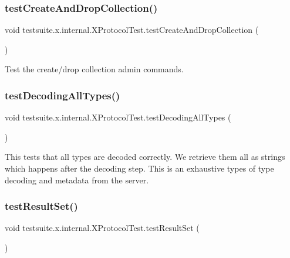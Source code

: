 \subsubsection{\texorpdfstring{test\+Create\+And\+Drop\+Collection()}{testCreateAndDropCollection()}}
{\footnotesize\ttfamily void testsuite.\+x.\+internal.\+X\+Protocol\+Test.\+test\+Create\+And\+Drop\+Collection (\begin{DoxyParamCaption}{ }\end{DoxyParamCaption})}

Test the create/drop collection admin commands. \mbox{\label{classtestsuite_1_1x_1_1internal_1_1_x_protocol_test_aa1933ade962788c0bd42298b441e69cb}} 
\subsubsection{\texorpdfstring{test\+Decoding\+All\+Types()}{testDecodingAllTypes()}}
{\footnotesize\ttfamily void testsuite.\+x.\+internal.\+X\+Protocol\+Test.\+test\+Decoding\+All\+Types (\begin{DoxyParamCaption}{ }\end{DoxyParamCaption})}

This tests that all types are decoded correctly. We retrieve them all as strings which happens after the decoding step. This is an exhaustive types of type decoding and metadata from the server. \mbox{\label{classtestsuite_1_1x_1_1internal_1_1_x_protocol_test_adbaeaa413b4fecde68b32c0c8d609ddc}} 
\subsubsection{\texorpdfstring{test\+Result\+Set()}{testResultSet()}}
{\footnotesize\ttfamily void testsuite.\+x.\+internal.\+X\+Protocol\+Test.\+test\+Result\+Set (\begin{DoxyParamCaption}{ }\end{DoxyParamCaption})}

